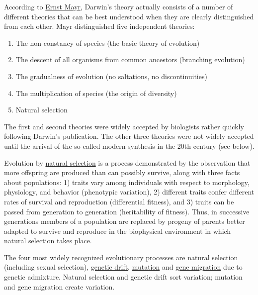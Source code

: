 According to \href{https://en.wikipedia.org/wiki/Ernst_Mayr}{Ernst
Mayr}, Darwin's theory actually consists of a number of different
theories that can be best understood when they are clearly distinguished
from each other. Mayr distinguished five independent theories:

\begin{enumerate}
\def\labelenumi{\arabic{enumi}.}
\tightlist
\item
  The non-constancy of species (the basic theory of evolution)
\item
  The descent of all organisms from common ancestors (branching
  evolution)
\item
  The gradualness of evolution (no saltations, no discontinuities)
\item
  The multiplication of species (the origin of diversity)
\item
  Natural selection
\end{enumerate}

The first and second theories were widely accepted by biologists rather
quickly following Darwin's publication. The other three theories were
not widely accepted until the arrival of the so-called modern synthesis
in the 20th century (see below).

Evolution by
\href{https://en.wikipedia.org/wiki/Natural_selection}{natural
selection} is a process demonstrated by the observation that more
offspring are produced than can possibly survive, along with three facts
about populations: 1) traits vary among individuals with respect to
morphology, physiology, and behavior (phenotypic variation), 2)
different traits confer different rates of survival and reproduction
(differential fitness), and 3) traits can be passed from generation to
generation (heritability of fitness). Thus, in successive generations
members of a population are replaced by progeny of parents better
adapted to survive and reproduce in the biophysical environment in which
natural selection takes place.

The four most widely recognized evolutionary processes are natural
selection (including sexual selection),
\href{https://en.wikipedia.org/wiki/Genetic_drift}{genetic drift},
\href{https://en.wikipedia.org/wiki/Mutation}{mutation} and
\href{https://en.wikipedia.org/wiki/Gene_flow}{gene migration} due to
genetic admixture. Natural selection and genetic drift sort variation;
mutation and gene migration create variation.


